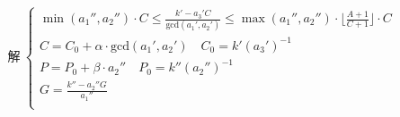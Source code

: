 \documentclass[preview]{standalone}
\begin{document}
\begin{align*}
\text{解}~\begin{cases}\min (a_1'', a_2'') \cdot C \leq \frac{k' - a_3' C}{\mathrm{gcd}(a_1', a_2')} \leq \max (a_1'', a_2'') \cdot \lfloor \frac{A + 1}{C + 1} \rfloor \cdot C \\C = C_0 + \alpha \cdot \mathrm{gcd}(a_1', a_2') \quad C_0 = k' (a_3')^{-1} \\P = P_0 + \beta \cdot a_2'' \quad P_0 = k'' (a_2'')^{-1} \\G = \frac{k'' - a_2'' G}{a_1''} \\\end{cases}
\end{align*}
\end{document}
